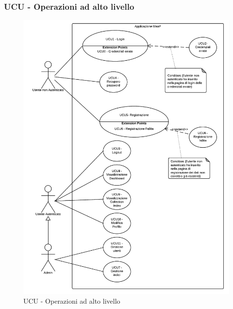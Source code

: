 \subsubsection{UCU - Operazioni ad alto livello}    
    \begin{figure}[H]
      \begin{center}
      \includegraphics[scale=0.16]{UML/UCU - Operazioni ad alto livello.png}
      \caption{UCU - Operazioni ad alto livello}
      \end{center} 
    \end{figure}    
    
